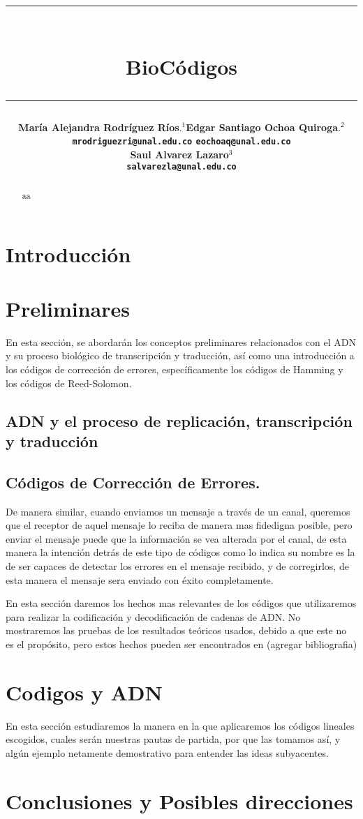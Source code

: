 \documentclass[12pt]{article}
\title{\vspace{-2cm}\par\noindent\rule{16cm}{1pt}\large
\\\bfseries BioCódigos
\vspace{-0.34cm}\par\noindent\hspace{0.15cm}\rule{16cm}{1pt}
\vspace{-0.6cm}
}
\author{\small \bfseries María Alejandra Rodríguez Ríos$.^1$\quad \quad\small Edgar Santiago Ochoa Quiroga$.^{2}$\\ \small \quad \texttt{mrodriguezri@unal.edu.co} \quad \quad \quad \quad \quad \quad \texttt{eochoaq@unal.edu.co}\quad\quad \quad\\ \small \bfseries Saul Alvarez Lazaro$^{3}$\\
\small \texttt{salvarezla@unal.edu.co}
}
\begin{document}
\maketitle
\begin{abstract}
aa
\end{abstract}

\section{Introducción}





\section{Preliminares}
En esta sección, se abordarán los conceptos preliminares relacionados con el ADN y su proceso biológico de transcripción y traducción, así como una introducción a los códigos de corrección de errores, específicamente los códigos de Hamming y los códigos de Reed-Solomon.
\subsection{ADN y el proceso de replicación, transcripción y traducción}

\subsection{Códigos de Corrección de Errores.}
De manera similar, cuando enviamos un mensaje a través de un canal, queremos que el receptor de aquel mensaje lo reciba de manera mas fidedigna posible, pero enviar el mensaje puede que la información se vea alterada por el canal, de esta manera la intención detrás de este tipo de códigos como lo indica su nombre es la de ser capaces de detectar los errores en el mensaje recibido, y de corregirlos, de esta manera el mensaje sera enviado con éxito completamente.

En esta sección daremos los hechos mas relevantes de los códigos que utilizaremos para realizar la codificación y decodificación de cadenas de ADN. No mostraremos las pruebas de los resultados teóricos usados, debido a que este no es el propósito, pero estos hechos pueden ser encontrados en (agregar bibliografia)


\section{Codigos y ADN}
En esta sección estudiaremos la manera en la que aplicaremos los códigos lineales escogidos, cuales serán nuestras pautas de partida, por que las tomamos así, y algún ejemplo netamente demostrativo para entender las ideas subyacentes.


\section{Conclusiones y Posibles direcciones}




\nocite{*}
\end{document}
